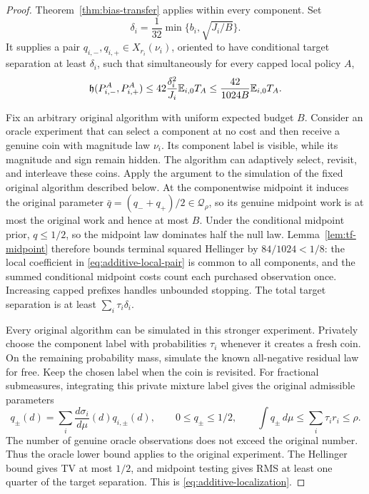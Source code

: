 \begin{proof}
Theorem~\ref{thm:bias-transfer} applies within every component. Set
\[
 \delta_i=\frac1{32}\min\{b_i,\sqrt{J_i/B}\}.
\]
It supplies a pair $q_{i,-},q_{i,+}\in X_{r_i}(\nu_i)$, oriented to have
conditional target separation at least $\delta_i$, such that simultaneously
for every capped local policy $A$,
\begin{equation}\label{eq:additive-local-pair}
 \mathfrak h(P_{i,-}^A,P_{i,+}^A)
 \le42\frac{\delta_i^2}{J_i}\mathbb E_{i,0}T_A
 \le\frac{42}{1024B}\mathbb E_{i,0}T_A.
\end{equation}

Fix an arbitrary original algorithm with uniform expected budget $B$.
Consider an oracle experiment that can select a component at no cost and
then receive a genuine coin with magnitude law $\nu_i$. Its component label
is visible, while its magnitude and sign remain hidden. The algorithm can
adaptively select, revisit, and interleave these coins. Apply the argument
to the simulation of the fixed original algorithm described below. At the
componentwise midpoint it induces the original parameter
$\bar q=(q_-+q_+)/2\in\mathcal Q_\rho$, so its genuine midpoint work is
at most the original work and hence at most $B$. Under the conditional
midpoint prior, $q\le1/2$, so the midpoint law dominates half the null law.
Lemma~\ref{lem:tf-midpoint} therefore bounds terminal squared
Hellinger by $84/1024<1/8$: the local coefficient in
\eqref{eq:additive-local-pair} is common to all components, and the summed
conditional midpoint costs count each purchased observation once.
Increasing capped prefixes handles unbounded stopping. The total target
separation is at least $\sum_i\tau_i\delta_i$.

Every original algorithm can be simulated in this stronger experiment.
Privately choose the component label with probabilities $\tau_i$ whenever
it creates a fresh coin. On the remaining probability mass, simulate the
known all-negative residual law for free. Keep the chosen label when the
coin is revisited. For fractional submeasures, integrating this private
mixture label gives the original admissible parameters
\[
 q_\pm(d)=\sum_i\frac{d\sigma_i}{d\mu}(d)q_{i,\pm}(d),
 \qquad 0\le q_\pm\le1/2,\qquad
 \int q_\pm\,d\mu\le\sum_i\tau_i r_i\le\rho.
\]
The number of genuine oracle observations does not exceed the original
number. Thus the oracle lower bound applies to the original experiment.
The Hellinger bound gives TV at most $1/2$, and midpoint testing gives RMS
at least one quarter of the target separation. This is
\eqref{eq:additive-localization}.
\end{proof}

